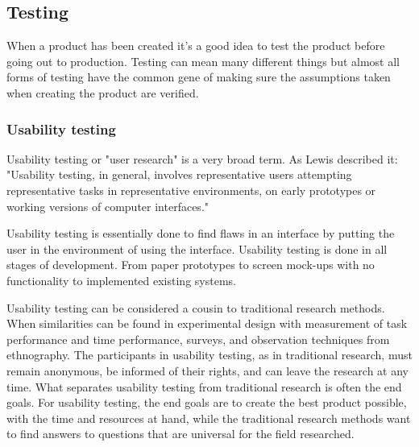 




\subsection{Testing}%
\label{sub:Testing}
When a product has been created it's a good idea to test the product before going out to production. Testing can mean many different things but almost all forms of testing have the common gene of making sure the assumptions taken when creating the product are verified. 

\subsubsection{Usability testing}%
\label{ssub:User testing}
Usability testing or "user research" is a very broad term. As Lewis \cite{lewis2006usability} described it: "Usability testing, in general, involves representative users attempting representative tasks in representative environments, on early prototypes or working versions of computer interfaces."

Usability testing is essentially done to find flaws in an interface by putting the user in the environment of using the interface. Usability testing is done in all stages of development. From paper prototypes to screen mock-ups with no functionality to implemented existing systems. 

Usability testing can be considered a cousin to traditional research methods. When similarities can be found in experimental design with measurement of task performance and time performance, surveys, and observation techniques from ethnography. The participants in usability testing, as in traditional research, must remain anonymous, be informed of their rights, and can leave the research at any time. 
What separates usability testing from traditional research is often the end goals. For usability testing, the end goals are to create the best product possible, with the time and resources at hand, while the traditional research methods want to find answers to questions that are universal for the field researched. 

